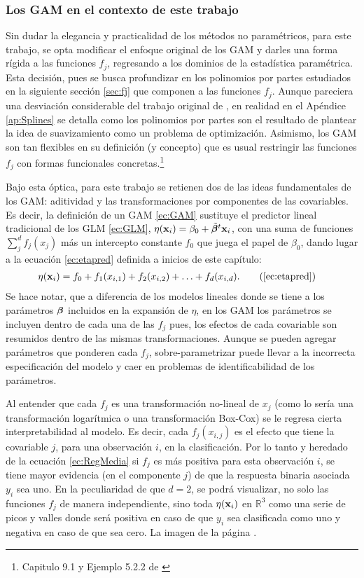 \documentclass[../Main/Main.tex]{subfiles}
\begin{document}
\subsubsection*{Los GAM en el contexto de este trabajo}
Sin dudar la elegancia y practicalidad de los métodos no paramétricos, para este trabajo, se opta modificar el enfoque original de los GAM y darles una forma rígida a las funciones $f_j$, regresando a los dominios de la estadística paramétrica. Esta decisión, pues se busca profundizar en los polinomios por partes estudiados en la siguiente sección \ref{sec:fj} que componen a las funciones $f_j$. Aunque pareciera una desviación considerable del trabajo original de \citeauthor{hastie1990generalized}, en realidad en el Apéndice \ref{ap:Splines} se detalla como los polinomios por partes son el resultado de plantear la idea de suavizamiento como un problema de optimización. Asimismo, los GAM son tan flexibles en su definición (y concepto) que es usual restringir las funciones $f_j$ con formas funcionales concretas.\footnote{Capitulo 9.1 y Ejemplo 5.2.2 de \citet{hastie2008elements}}

Bajo esta óptica, para este trabajo se retienen dos de las ideas fundamentales de los GAM: aditividad y las transformaciones por componentes de las covariables. Es decir, la definición de un GAM \eqref{ec:GAM} sustituye el predictor lineal tradicional de los GLM \eqref{ec:GLM}, $\eta(\mathbf{x}_i) = \beta_0 + \tilde{\bm{\beta}}^t\mathbf{x}_i$, con una suma de funciones $\sum_j^d f_j(x_j)$ más un intercepto constante $f_0$ que juega el papel de $\beta_0$, dando lugar a la ecuación \eqref{ec:etapred} definida a inicios de este capítulo:
\begin{align}
\eta(\xni) &= f_0 + f_1(x_{i,1}) + f_2(x_{i,2}) + \ldots + f_d(x_{i,d}). \tag{\ref{ec:etapred}}
\end{align}
Se hace notar, que a diferencia de los modelos lineales donde se tiene a los parámetros $\bm{\beta}$ incluidos en la expansión de $\eta$,  en los GAM los parámetros se incluyen dentro de cada una de las $f_j$ pues, los efectos de cada covariable son resumidos dentro de las mismas transformaciones. Aunque se pueden agregar parámetros que ponderen cada $f_j$, sobre-parametrizar puede llevar a la incorrecta especificación del modelo y caer en problemas de identificabilidad de los parámetros.

Al entender que cada $f_j$ es una transformación no-lineal de $x_j$ (como lo sería una transformación logarítmica o una transformación Box-Cox) se le regresa cierta interpretabilidad al modelo. Es decir, cada $f_j(x_{i,j})$ es el efecto que tiene la covariable $j$, para una observación $i$, en la clasificación. Por lo tanto y heredado de la ecuación \eqref{ec:RegMedia} si $f_j$ es más positiva para esta observación $i$, se tiene mayor evidencia (en el componente $j$) de que la respuesta binaria asociada $y_i$ sea uno. En la peculiaridad de que $d = 2$, se podrá visualizar, no solo las funciones $f_j$ de manera independiente, sino toda $\eta(\mathbf{x}_i)$ en $\mathbb{R}^3$ como una serie de picos y valles donde será positiva en caso de que $y_i $ sea clasificada como uno y  negativa en caso de que sea cero. La imagen de la página \pageref{fig:YY3D}.
\end{document}
